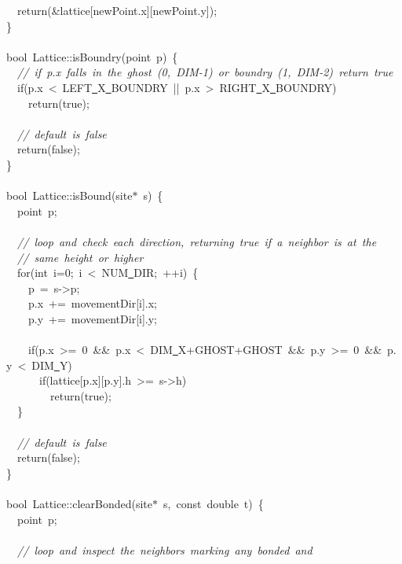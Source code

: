 {\ \ return(\&lattice[newPoint.x][newPoint.y]);\\
\}\\
\ \\
bool\ Lattice::isBoundry(point\ p)\ \{\\
\ \ \textsl{//\ if\ p.x\ falls\ in\ the\ ghost\ (0,\ DIM-{}1)\ or\ boundry\ (1,\ DIM-{}2)\ return\ true}\\
\ \ if(p.x\ <{}\ LEFT\underline\ X\underline\ BOUNDRY\ ||\ p.x\ >{}\ RIGHT\underline\ X\underline\ BOUNDRY)\\
\ \ \ \ return(true);\\
\ \\
\ \ \textsl{//\ default\ is\ false}\\
\ \ return(false);\\
\}\\
\ \\
bool\ Lattice::isBound(site$\ast$\ s)\ \{\\
\ \ point\ p;\\
\ \\
\ \ \textsl{//\ loop\ and\ check\ each\ direction,\ returning\ true\ if\ a\ neighbor\ is\ at\ the}\\
\ \ \textsl{//\ same\ height\ or\ higher}\\
\ \ for(int\ i=0;\ i\ <{}\ NUM\underline\ DIR;\ ++i)\ \{\\
\ \ \ \ p\ =\ s-{}>{}p;\\
\ \ \ \ p.x\ +=\ movementDir[i].x;\\
\ \ \ \ p.y\ +=\ movementDir[i].y;\\
\ \\
\ \ \ \ if(p.x\ >{}=\ 0\ \&\&\ p.x\ <{}\ DIM\underline\ X+GHOST+GHOST\ \&\&\ p.y\ >{}=\ 0\ \&\&\ p.y\ <{}\ DIM\underline\ Y)\\
\ \ \ \ \ \ if(lattice[p.x][p.y].h\ >{}=\ s-{}>{}h)\\
\ \ \ \ \ \ \ \ return(true);\\
\ \ \}\\
\ \\
\ \ \textsl{//\ default\ is\ false}\\
\ \ return(false);\\
\}\\
\ \\
bool\ Lattice::clearBonded(site$\ast$\ s,\ const\ double\ t)\ \{\\
\ \ point\ p;\\
\ \\
\ \ \textsl{//\ loop\ and\ inspect\ the\ neighbors\ marking\ any\ bonded\ and}\\
}
